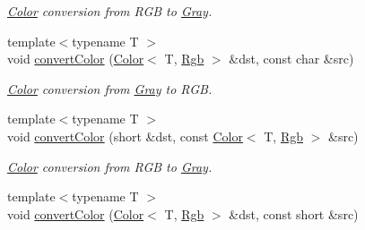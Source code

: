 \begin{DoxyCompactItemize}
\begin{DoxyCompactList}\small\item\em \hyperlink{class_d_o_1_1_color}{Color} conversion from R\-G\-B to \hyperlink{struct_d_o_1_1_gray}{Gray}. \end{DoxyCompactList}\item 
\hypertarget{group___color_conversion_gaef965f101a5d8240f27f144dd810e5fd}{{\footnotesize template$<$typename T $>$ }\\void \hyperlink{group___color_conversion_gaef965f101a5d8240f27f144dd810e5fd}{convert\-Color} (\hyperlink{class_d_o_1_1_color}{Color}$<$ T, \hyperlink{group___color_space_gaad92fea51e98e11252ac86f2c8665d13}{Rgb} $>$ \&dst, const char \&src)}\label{group___color_conversion_gaef965f101a5d8240f27f144dd810e5fd}

\begin{DoxyCompactList}\small\item\em \hyperlink{class_d_o_1_1_color}{Color} conversion from \hyperlink{struct_d_o_1_1_gray}{Gray} to R\-G\-B. \end{DoxyCompactList}\item 
\hypertarget{group___color_conversion_ga1e5a93ec87d6a83ace06fdf2db0444b1}{{\footnotesize template$<$typename T $>$ }\\void \hyperlink{group___color_conversion_ga1e5a93ec87d6a83ace06fdf2db0444b1}{convert\-Color} (short \&dst, const \hyperlink{class_d_o_1_1_color}{Color}$<$ T, \hyperlink{group___color_space_gaad92fea51e98e11252ac86f2c8665d13}{Rgb} $>$ \&src)}\label{group___color_conversion_ga1e5a93ec87d6a83ace06fdf2db0444b1}

\begin{DoxyCompactList}\small\item\em \hyperlink{class_d_o_1_1_color}{Color} conversion from R\-G\-B to \hyperlink{struct_d_o_1_1_gray}{Gray}. \end{DoxyCompactList}\item 
\hypertarget{group___color_conversion_ga03d8f2fa5babb6e94d68322054c63f74}{{\footnotesize template$<$typename T $>$ }\\void \hyperlink{group___color_conversion_ga03d8f2fa5babb6e94d68322054c63f74}{convert\-Color} (\hyperlink{class_d_o_1_1_color}{Color}$<$ T, \hyperlink{group___color_space_gaad92fea51e98e11252ac86f2c8665d13}{Rgb} $>$ \&dst, const short \&src)}\label{group___color_conversion_ga03d8f2fa5babb6e94d68322054c63f74}


\end{DoxyCompactItemize}
